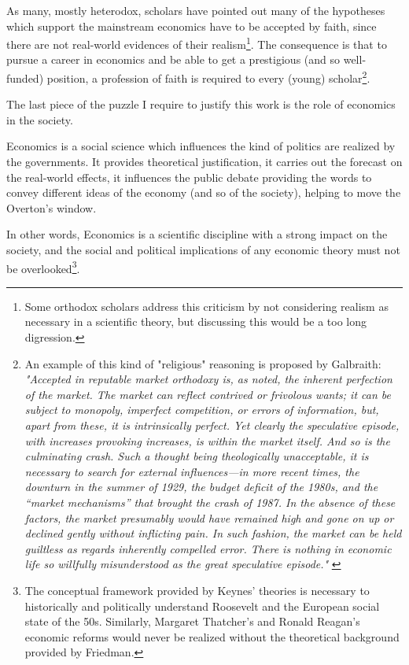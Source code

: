 \documentclass[a4paper, headings=standardclasses]{scrartcl}
\begin{document}
As many, mostly heterodox, scholars have pointed out many of the hypotheses which support the mainstream economics have to be accepted by faith, since there are not real-world evidences of their realism\footnote{Some orthodox scholars address this criticism by not considering realism as necessary in a scientific theory, but discussing this would be a too long digression.}.
The consequence is that to pursue a career in economics and be able to get a prestigious (and so well-funded) position, a profession of faith is required to every (young) scholar\footnote{An example of this kind of "religious" reasoning is proposed by Galbraith: \textit{"Accepted in reputable market orthodoxy is, as noted, the inherent perfection of the market. The market can reflect contrived or frivolous wants; it can be subject to monopoly, imperfect competition, or errors of information, but, apart from these, it is intrinsically perfect. Yet clearly the speculative episode, with increases provoking increases, is within the market itself. And so is the culminating crash. Such a thought being theologically unacceptable, it is necessary to search for external influences—in more recent times, the downturn in the summer of 1929, the budget deficit of the 1980s, and the “market mechanisms” that brought the crash of 1987. In the absence of these factors, the market presumably would have remained high and gone on up or declined gently without inflicting pain. In such fashion, the market can be held guiltless as regards inherently compelled error. There is nothing in economic life so willfully misunderstood as the great speculative episode."} \parencite{galbraith1994}}.

The last piece of the puzzle I require to justify this work is the role of economics in the society.

Economics is a social science which influences the kind of politics are realized by the governments. It provides theoretical justification, it carries out the forecast on the real-world effects, it influences the public debate providing the words to convey different ideas of the economy (and so of the society), helping to move the Overton's window.

In other words, Economics is a scientific discipline with a strong impact on the society, and the social and political implications of any economic theory must not be overlooked\footnote{The conceptual framework provided by Keynes' theories is necessary to historically and politically understand Roosevelt and the European social state of the 50s. Similarly, Margaret Thatcher's and Ronald Reagan's economic reforms would never be realized without the theoretical background provided by Friedman.}.
\end{document}
